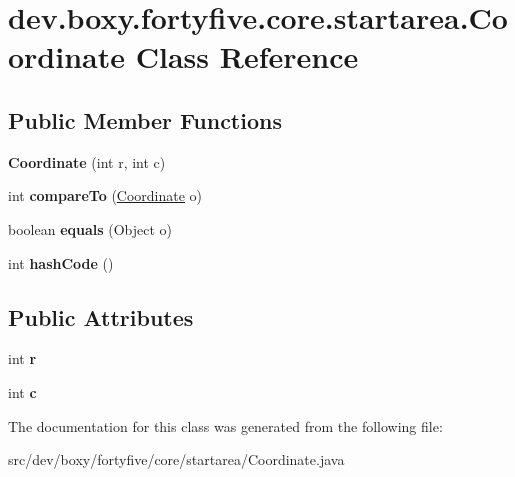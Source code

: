 \hypertarget{classdev_1_1boxy_1_1fortyfive_1_1core_1_1startarea_1_1_coordinate}{
\section{dev.boxy.fortyfive.core.startarea.Coordinate Class Reference}
\label{d2/d3b/classdev_1_1boxy_1_1fortyfive_1_1core_1_1startarea_1_1_coordinate}
}
\subsection*{Public Member Functions}
\begin{DoxyCompactItemize}
\item 
\hypertarget{classdev_1_1boxy_1_1fortyfive_1_1core_1_1startarea_1_1_coordinate_a7981cad27d3072a73694d86a2619218a}{
{\bfseries Coordinate} (int r, int c)}
\label{d2/d3b/classdev_1_1boxy_1_1fortyfive_1_1core_1_1startarea_1_1_coordinate_a7981cad27d3072a73694d86a2619218a}

\item 
\hypertarget{classdev_1_1boxy_1_1fortyfive_1_1core_1_1startarea_1_1_coordinate_ab159185842e33a6d8489e3f20d21d138}{
int {\bfseries compareTo} (\hyperlink{classdev_1_1boxy_1_1fortyfive_1_1core_1_1startarea_1_1_coordinate}{Coordinate} o)}
\label{d2/d3b/classdev_1_1boxy_1_1fortyfive_1_1core_1_1startarea_1_1_coordinate_ab159185842e33a6d8489e3f20d21d138}

\item 
\hypertarget{classdev_1_1boxy_1_1fortyfive_1_1core_1_1startarea_1_1_coordinate_af8e95db679cc06f8f190258df0512523}{
boolean {\bfseries equals} (Object o)}
\label{d2/d3b/classdev_1_1boxy_1_1fortyfive_1_1core_1_1startarea_1_1_coordinate_af8e95db679cc06f8f190258df0512523}

\item 
\hypertarget{classdev_1_1boxy_1_1fortyfive_1_1core_1_1startarea_1_1_coordinate_a589f3ca06508daacfde4f716f56d77c0}{
int {\bfseries hashCode} ()}
\label{d2/d3b/classdev_1_1boxy_1_1fortyfive_1_1core_1_1startarea_1_1_coordinate_a589f3ca06508daacfde4f716f56d77c0}

\end{DoxyCompactItemize}
\subsection*{Public Attributes}
\begin{DoxyCompactItemize}
\item 
\hypertarget{classdev_1_1boxy_1_1fortyfive_1_1core_1_1startarea_1_1_coordinate_ada91a4cb5928d087455f22eaaf163a49}{
int {\bfseries r}}
\label{d2/d3b/classdev_1_1boxy_1_1fortyfive_1_1core_1_1startarea_1_1_coordinate_ada91a4cb5928d087455f22eaaf163a49}

\item 
\hypertarget{classdev_1_1boxy_1_1fortyfive_1_1core_1_1startarea_1_1_coordinate_a2343c1d1d00f45a2b61b57bc6f7f3cdb}{
int {\bfseries c}}
\label{d2/d3b/classdev_1_1boxy_1_1fortyfive_1_1core_1_1startarea_1_1_coordinate_a2343c1d1d00f45a2b61b57bc6f7f3cdb}

\end{DoxyCompactItemize}


The documentation for this class was generated from the following file:\begin{DoxyCompactItemize}
\item 
src/dev/boxy/fortyfive/core/startarea/Coordinate.java\end{DoxyCompactItemize}
